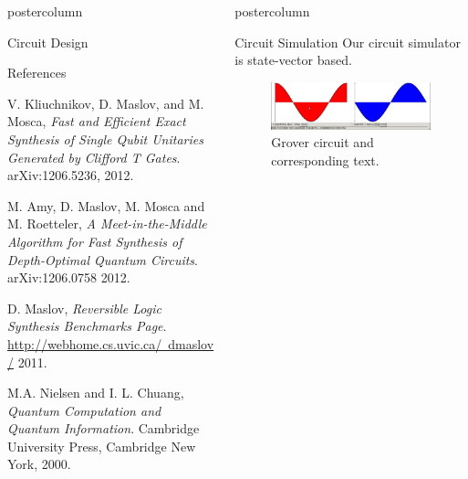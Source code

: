 \documentclass[final]{beamer} %
\begin{document}
\begin{frame}{}
\begin{columns}
\begin{column}{.33\textwidth}
\begin{beamercolorbox}[center,wd=\textwidth]{postercolumn}
\begin{minipage}[T]{.95\textwidth}
\begin{block}{\large Circuit Design}
           \end{block}

           \begin{block}{\large References}
		\begin{thebibliography}{9}
\small{
  		V. Kliuchnikov, D. Maslov, and M. Mosca,
  		\emph{Fast and Efficient Exact Synthesis of Single Qubit Unitaries Generated by Clifford T Gates}.
  		arXiv:1206.5236,
  		2012.

  		M. Amy, D. Maslov, M. Mosca and M. Roetteler,
  		\emph{A Meet-in-the-Middle Algorithm for Fast Synthesis of Depth-Optimal Quantum Circuits}.
  		arXiv:1206.0758
  		2012.

  		D. Maslov,
  		\emph{Reversible Logic Synthesis Benchmarks Page}.
  		\href{http://webhome.cs.uvic.ca/~dmaslov/}{http://webhome.cs.uvic.ca/~dmaslov/}
  		2011.

  		M.A. Nielsen and I. L. Chuang, 
  		\emph{Quantum Computation and Quantum Information}.
  		Cambridge University Press,
		Cambridge New York,
  		2000.
}
		\end{thebibliography}
           \end{block}

         \end{minipage}
      \end{beamercolorbox}
    \end{column}

    \begin{column}{.33\textwidth}
      \begin{beamercolorbox}[center,wd=\textwidth]{postercolumn}
         \begin{minipage}[T]{.95\textwidth}
           \begin{block}{\large Circuit Simulation}
              Our circuit simulator is state-vector based.

                    \centering 
		\begin{figure}[!htbp]
		  \centering
		  \includegraphics{figures/state.png}
		  \caption{Grover circuit and corresponding text.}
		\end{figure}


\end{block}
\end{minipage}
\end{beamercolorbox}
\end{column}
\end{columns}
\end{frame}
\end{document}
